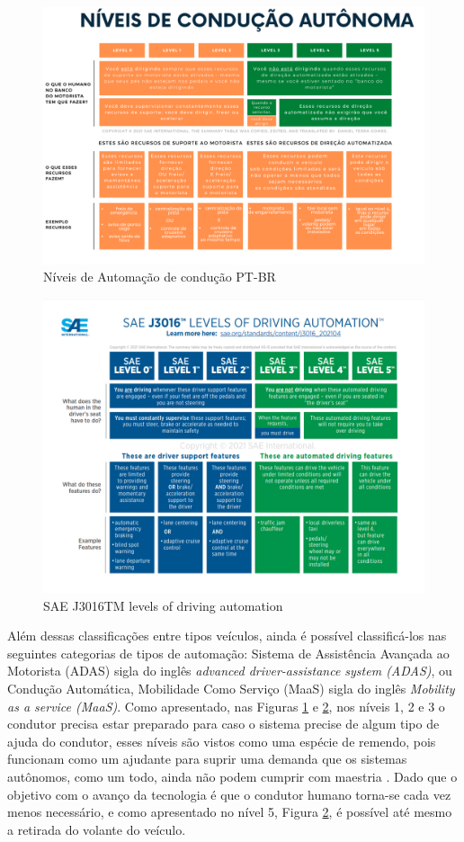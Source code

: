 \begin{figure}[H]
\centering
\includegraphics[width=15cm]{Figures/IC-Graph1.png}
\caption{Níveis de Automação de condução PT-BR}
\label{Graph_PT}
\end{figure}
\begin{figure}[H]
\centering
\includegraphics[width=15cm]{Figures/IC-GrapEN.png}
\caption{SAE J3016TM levels of driving automation \cite{SAE}}
\label{Graph_EN}
\end{figure}

Além dessas classificações entre tipos veículos, ainda é possível classificá-los nas seguintes categorias de tipos de automação: Sistema de Assistência Avançada ao Motorista (ADAS) sigla do inglês \textit{advanced driver-assistance system (ADAS)}, ou Condução Automática, Mobilidade Como Serviço (MaaS) sigla do inglês \textit{Mobility as a service (MaaS)}.
Como apresentado, nas Figuras \ref{Graph_PT} e \ref{Graph_EN}, nos níveis 1, 2 e 3 o condutor precisa estar preparado para caso o sistema precise de algum tipo de ajuda do condutor, esses níveis são vistos como uma espécie de remendo, pois funcionam como um ajudante para suprir uma demanda que os sistemas autônomos, como um todo, ainda não podem cumprir com maestria \cite{4cenarios_ocidental}. Dado que o objetivo com o avanço da tecnologia é que o condutor humano torna-se cada vez menos necessário, e como apresentado no nível 5, Figura \ref{Graph_EN}, é possível até mesmo a retirada do volante do veículo. 

